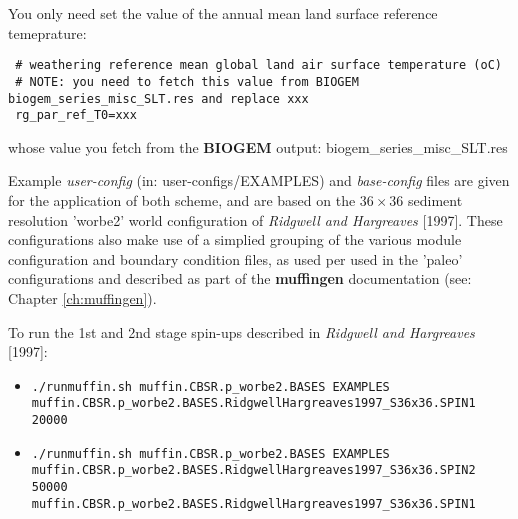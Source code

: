 \begin{enumerate}
\vspace{1mm}
You only need set the value of the annual mean land surface reference temeprature:

\vspace{-0mm}\footnotesize\begin{verbatim}
 # weathering reference mean global land air surface temperature (oC)
 # NOTE: you need to fetch this value from BIOGEM biogem_series_misc_SLT.res and replace xxx
 rg_par_ref_T0=xxx
\end{verbatim}\normalsize\vspace{-0mm}
whose value you fetch from the \textbf{BIOGEM} output: \textsf{\footnotesize biogem\_series\_misc\_SLT.res}

\end{enumerate}


\newpage
%
\noindent Example \textit{user-config} (in: \textsf{\footnotesize user-configs/EXAMPLES}) and \textit{base-config} files are given for the application of both scheme, and are based on the \(36\times 36\) sediment resolution 'worbe2' world configuration of \textit{Ridgwell and Hargreaves} [1997]. These configurations also make use of a simplied grouping of the various module configuration and boundary condition files, as used per used in the 'paleo' configurations and described as part of the \textbf{muffingen} documentation (see: Chapter \ref{ch:muffingen}).

To run the 1st and 2nd stage spin-ups described in \textit{Ridgwell and Hargreaves} [1997]:
\begin{itemize}[noitemsep]
\vspace{1mm}
\item []
\vspace{-0mm}\small\begin{verbatim}
./runmuffin.sh muffin.CBSR.p_worbe2.BASES EXAMPLES
muffin.CBSR.p_worbe2.BASES.RidgwellHargreaves1997_S36x36.SPIN1 20000
\end{verbatim}\normalsize\vspace{-0mm}
\vspace{1mm}
\item []
\vspace{-0mm}\small\begin{verbatim}
./runmuffin.sh muffin.CBSR.p_worbe2.BASES EXAMPLES
muffin.CBSR.p_worbe2.BASES.RidgwellHargreaves1997_S36x36.SPIN2 50000
muffin.CBSR.p_worbe2.BASES.RidgwellHargreaves1997_S36x36.SPIN1
\end{verbatim}\normalsize\vspace{-0mm}
\end{itemize}

